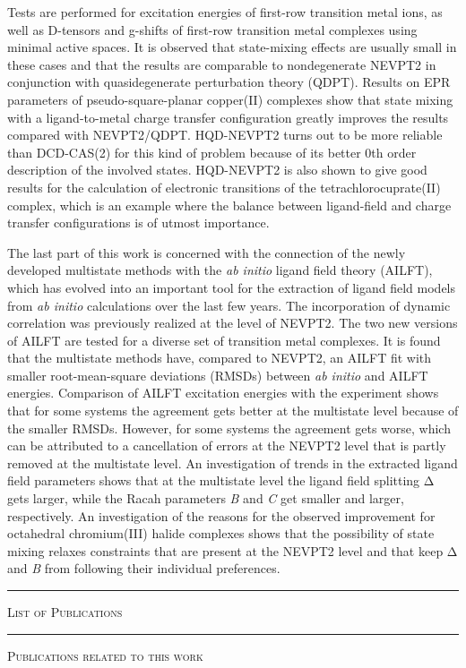 Tests are performed for excitation energies of
first-row transition metal ions, as well as D-tensors and g-shifts of first-row transition
metal complexes using minimal active spaces. It is observed that state-mixing effects
are usually small in these cases and that the results are comparable to nondegenerate NEVPT2 in conjunction with quasidegenerate perturbation theory (QDPT). Results on
EPR parameters of pseudo-square-planar copper(II) complexes show that state mixing with
a ligand-to-metal charge transfer configuration greatly improves the results
compared with NEVPT2/QDPT. HQD-NEVPT2 turns out to be more reliable than DCD-CAS(2) for this kind of problem because of its better 0th order description of the involved states.
HQD-NEVPT2 is also shown to give good results for the calculation of electronic
transitions of the tetrachlorocuprate(II) complex, which is an example where the balance between ligand-field
and charge transfer configurations is of utmost importance.

The last part of this work is concerned with the connection of the newly developed multistate methods with the \textit{ab initio} ligand field theory (AILFT), which has evolved into an
important tool for the extraction of ligand field models from \textit{ab initio} calculations over the last few years. The
incorporation of dynamic correlation was previously realized
at the level of NEVPT2. The two new versions of AILFT are tested for a diverse set of transition metal
complexes. It is found that the multistate methods have, compared to NEVPT2, an
AILFT fit with smaller root-mean-square deviations (RMSDs) between \textit{ab initio} and
AILFT energies. Comparison of AILFT excitation energies with the experiment shows
that for some systems the agreement gets better at the multistate level because of the
smaller RMSDs. However, for some systems the agreement gets worse, which can be
attributed to a cancellation of errors at the NEVPT2 level that is partly removed at the
multistate level. An investigation of trends in the extracted li\-gand field parameters shows
that at the multistate level the ligand field splitting Δ gets larger, while the Racah
parameters \textit{B} and \textit{C} get smaller and larger, respectively. An investigation of the reasons
for the observed improvement for octahedral chromium(III) halide complexes shows that the
possibility of state mixing relaxes constraints that are present at the NEVPT2 level and that
keep Δ and \textit{B} from following their individual preferences.

\cleardoublepage
\hrule
\vspace*{0.5cm}
{\LARGE\textsc{List of Publications}}
\vspace{1cm}
\hrule
\vspace{0.5cm}
{\large\textsc{Publications related to this work}}

